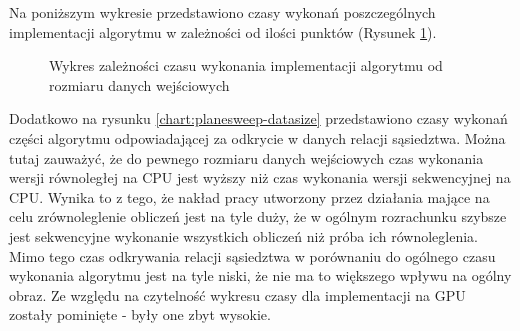 \documentclass[12pt]{article}
\begin{document}
Na poniższym wykresie przedstawiono czasy wykonań poszczególnych implementacji algorytmu w zależności od ilości punktów (Rysunek \ref{chart:datasize}).

\begin{figure}[ht]
\caption{Wykres zależności czasu wykonania implementacji algorytmu od rozmiaru danych wejściowych}
\label{chart:datasize}
\end{figure}

Dodatkowo na rysunku \ref{chart:planesweep-datasize} przedstawiono czasy wykonań części algorytmu odpowiadającej za odkrycie w danych relacji sąsiedztwa. Można tutaj zauważyć, że do pewnego rozmiaru danych wejściowych czas wykonania wersji równoległej na CPU jest wyższy niż czas wykonania wersji sekwencyjnej na CPU. Wynika to z tego, że nakład pracy utworzony przez działania mające na celu zrównoleglenie obliczeń jest na tyle duży, że w ogólnym rozrachunku szybsze jest sekwencyjne wykonanie wszystkich obliczeń niż próba ich równoleglenia. Mimo tego czas odkrywania relacji sąsiedztwa w porównaniu do ogólnego czasu wykonania algorytmu jest na tyle niski, że nie ma to większego wpływu na ogólny obraz. Ze względu na czytelność wykresu czasy dla implementacji na GPU zostały pominięte - były one zbyt wysokie.
\end{document}
